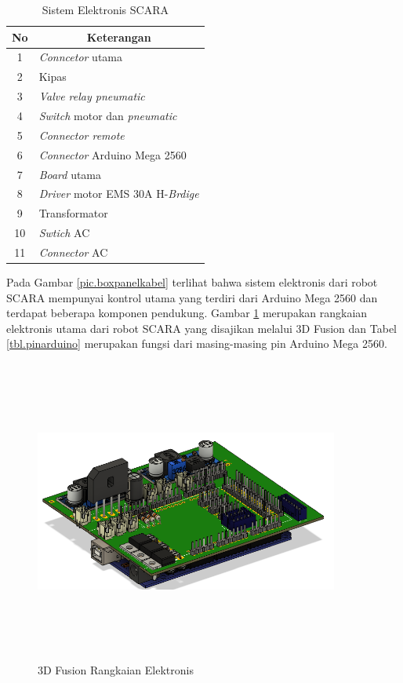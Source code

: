 \begin{longtable}{|c|l|}
	\caption{Sistem Elektronis SCARA}
	\label{tbl.elektronisscara}\\
	\hline
	\rowcolor[HTML]{9B9B9B} 
	No & \multicolumn{1}{c|}{\cellcolor[HTML]{9B9B9B}Keterangan} \\ \hline
	\endfirsthead
	\endhead
	1  & \textit{Conncetor} utama                                          \\ \hline
	2  & Kipas                                                     \\ \hline
	3  &\textit{Valve relay pneumatic}                                   \\ \hline
	4  &\textit{Switch} motor dan \textit{pneumatic}                              \\ \hline
	5  & \textit{Connector remote  }                                      \\ \hline
	6  & \textit{Connector} Arduino Mega 2560                             \\ \hline
	7  & \textit{Board} utama                                             \\ \hline
	8  & \textit{Driver} motor EMS 30A H-\textit{Brdige}                           \\ \hline
	9  & Transformator                                           \\ \hline
	10 & \textit{Swtich} AC                                               \\ \hline
	11 & \textit{Connector} AC                                            \\ \hline
\end{longtable}

Pada Gambar \ref{pic.boxpanelkabel} terlihat bahwa sistem elektronis dari robot SCARA mempunyai kontrol utama yang terdiri dari Arduino Mega 2560 dan terdapat beberapa komponen pendukung. Gambar \ref{pic.sisminarduino} merupakan rangkaian elektronis utama dari robot SCARA yang disajikan melalui 3D Fusion dan Tabel \ref{tbl.pinarduino} merupakan fungsi dari masing-masing pin Arduino Mega 2560.
\begin{figure}[H]
	\centering
	\includegraphics[width=10cm, height=10cm]{gambar/fusion.png}
	\caption{3D Fusion Rangkaian Elektronis}
	\label{pic.sisminarduino}
\end{figure}

